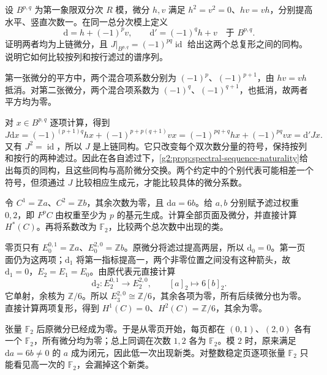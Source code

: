 \begin{exercise}\label{g2:ex:two-totalization-signs}
	设 \(B^{p,q}\) 为第一象限双分次 \(R\) 模，微分 \(h,v\) 满足 \(h^2=v^2=0\)、\(hv=vh\)，分别提高水平、竖直次数一。在同一总分次模上定义
	\[
		\mathrm d=h+(-1)^p v,\qquad \mathrm d'=(-1)^q h+v\quad\text{于 }B^{p,q}.
	\]
	证明两者均为上链微分，且 \(J|_{B^{p,q}}=(-1)^{pq}\operatorname{id}\) 给出这两个总复形之间的同构。说明它如何比较按列和按行滤过的谱序列。
\end{exercise}
\begin{solution}
	第一张微分的平方中，两个混合项系数分别为 \((-1)^p\)、\((-1)^{p+1}\)，由 \(hv=vh\) 抵消。对第二张微分，两个混合项系数为 \((-1)^q\)、\((-1)^{q+1}\)，也抵消，故两者平方均为零。

	对 \(x\in B^{p,q}\) 逐项计算，得到
	\[
		J\mathrm dx=(-1)^{(p+1)q}hx+(-1)^{p+p(q+1)}vx
		=(-1)^{pq+q}hx+(-1)^{pq}vx
		=\mathrm d'Jx.
	\]
	又有 \(J^2=\operatorname{id}\)，所以 \(J\) 是上链同构。它只改变每个双次数分量的符号，保持按列和按行的两种滤过。因此在各自滤过下，\cref{g2:prop:spectral-sequence-naturality}给出每页的同构，且这些同构与高阶微分交换。两个约定中的个别代表可能相差一个符号，但须通过 \(J\) 比较相应生成元，才能比较具体的微分系数。
\end{solution}

\begin{exercise}\label{g2:ex:spectral-sequence-torsion-d2}
	令 \(C^1=\mathbb Za\)、\(C^2=\mathbb Zb\)，其余次数为零，且 \(\mathrm da=6b\)。给 \(a,b\) 分别赋予滤过权重 \(0,2\)，即 \(F^pC\) 由权重至少为 \(p\) 的基元生成。计算全部页面及微分，并直接计算 \(H^*(C)\)。再将系数改为 \(\mathbb F_2\)，比较两个总次数中出现的类。
\end{exercise}
\begin{solution}
	零页只有 \(E_0^{0,1}=\mathbb Za\)、\(E_0^{2,0}=\mathbb Zb\)。原微分将滤过提高两层，所以 \(\mathrm d_0=0\)。第一页面仍为这两项；\(\mathrm d_1\) 将第一指标提高一，两个非零位置之间没有这种箭头，故 \(\mathrm d_1=0\)，\(E_2=E_1=E_0\)。由原代表元直接计算
	\[
		\mathrm d_2:E_2^{0,1}\longrightarrow E_2^{2,0},\qquad [a]_2\longmapsto6[b]_2.
	\]
	它单射，余核为 \(\mathbb Z/6\)。所以 \(E_3^{2,0}\cong\mathbb Z/6\)，其余各项为零，所有后续微分也为零。直接计算两项复形，得到 \(H^1(C)=0\)、\(H^2(C)=\mathbb Z/6\)，其余为零。

	张量 \(\mathbb F_2\) 后原微分已经成为零。于是从零页开始，每页都在 \((0,1)\)、\((2,0)\) 各有一个 \(\mathbb F_2\)，所有微分均为零；总上同调在次数 \(1,2\) 各为 \(\mathbb F_2\)。模 \(2\) 时，原来满足 \(\mathrm da=6b\ne0\) 的 \(a\) 成为闭元，因此低一次出现新类。对整数稳定页逐项张量 \(\mathbb F_2\) 只能看见高一次的 \(\mathbb F_2\)，会漏掉这个新类。
\end{solution}

